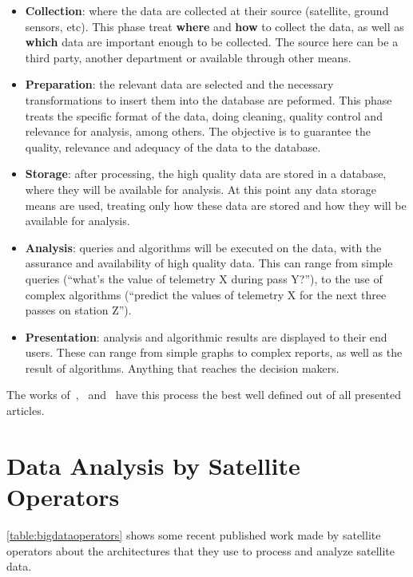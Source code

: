 \begin{itemize}[noitemsep]
  \item \textbf{Collection}: where the data are collected at their source (satellite, ground sensors, etc).
    This phase treat \textbf{where} and \textbf{how} to collect the data, as well as \textbf{which} data are important enough to be collected.
    The source here can be a third party, another department or available through other means.
  \item \textbf{Preparation}: the relevant data are selected and the necessary transformations to insert them into the database are peformed.
    This phase treats the specific format of the data, doing cleaning, quality control and relevance for analysis, among others.
    The objective is to guarantee the quality, relevance and adequacy of the data to the database.
  \item \textbf{Storage}: after processing, the high quality data are stored in a database, where they will be available for analysis.
    At this point any data storage means are used, treating only how these data are stored and how they will be available for analysis.
  \item \textbf{Analysis}: queries and algorithms will be executed on the data, with the assurance and availability of high quality data.
    This can range from simple queries (``what's the value of telemetry X during pass Y?''), to the use of complex algorithms (``predict the values of telemetry X for the next three passes on station Z'').
  \item \textbf{Presentation}: analysis and algorithmic results are displayed to their end users.
    These can range from simple graphs to complex reports, as well as the result of algorithms. Anything that reaches the decision makers.
\end{itemize}

The works of~\cite{zhangBigDataFramework2017},~\cite{mateikUsingBigData2017} and~\cite{boussoufBigDataBased2018} have this process the best well defined out of all presented articles.

\section{Data Analysis by Satellite Operators}\label{ch:corr:ops}

\autoref{table:bigdataoperators} shows some recent published work made by satellite operators about the architectures that they use to process and analyze satellite data.

